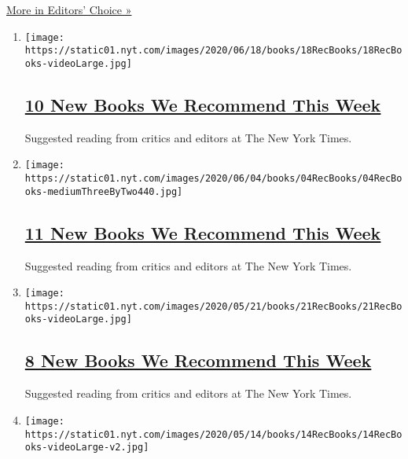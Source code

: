 \href{/column/new-books}{More in Editors' Choice »}

\begin{enumerate}
\def\labelenumi{\arabic{enumi}.}
\item
  \texttt{[image: https://static01.nyt.com/images/2020/06/18/books/18RecBooks/18RecBooks-videoLarge.jpg]}

  \hypertarget{10-new-books-we-recommend-this-week}{%
  \subsection{\texorpdfstring{\href{/2020/06/18/books/review/10-new-books-to-read-this-week.html}{10
  New Books We Recommend This
  Week}}{10 New Books We Recommend This Week}}\label{10-new-books-we-recommend-this-week}}

  Suggested reading from critics and editors at The New York Times.
\item
  \texttt{[image: https://static01.nyt.com/images/2020/06/04/books/04RecBooks/04RecBooks-mediumThreeByTwo440.jpg]}

  \hypertarget{11-new-books-we-recommend-this-week}{%
  \subsection{\texorpdfstring{\href{/2020/06/04/books/review/11-new-books-to-read-this-week.html}{11
  New Books We Recommend This
  Week}}{11 New Books We Recommend This Week}}\label{11-new-books-we-recommend-this-week}}

  Suggested reading from critics and editors at The New York Times.
\item
  \texttt{[image: https://static01.nyt.com/images/2020/05/21/books/21RecBooks/21RecBooks-videoLarge.jpg]}

  \hypertarget{8-new-books-we-recommend-this-week}{%
  \subsection{\texorpdfstring{\href{/2020/05/21/books/review/8-new-books-to-read-this-week.html}{8
  New Books We Recommend This
  Week}}{8 New Books We Recommend This Week}}\label{8-new-books-we-recommend-this-week}}

  Suggested reading from critics and editors at The New York Times.
\item
  \texttt{[image: https://static01.nyt.com/images/2020/05/14/books/14RecBooks/14RecBooks-videoLarge-v2.jpg]}

  \hypertarget{10-new-books-we-recommend-this-week-1}{%
}
\end{enumerate}
